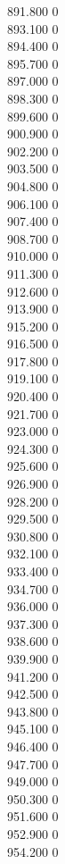 { 891.800	0 \\
 893.100	0 \\
 894.400	0 \\
 895.700	0 \\
 897.000	0 \\
 898.300	0 \\
 899.600	0 \\
 900.900	0 \\
 902.200	0 \\
 903.500	0 \\
 904.800	0 \\
 906.100	0 \\
 907.400	0 \\
 908.700	0 \\
 910.000	0 \\
 911.300	0 \\
 912.600	0 \\
 913.900	0 \\
 915.200	0 \\
 916.500	0 \\
 917.800	0 \\
 919.100	0 \\
 920.400	0 \\
 921.700	0 \\
 923.000	0 \\
 924.300	0 \\
 925.600	0 \\
 926.900	0 \\
 928.200	0 \\
 929.500	0 \\
 930.800	0 \\
 932.100	0 \\
 933.400	0 \\
 934.700	0 \\
 936.000	0 \\
 937.300	0 \\
 938.600	0 \\
 939.900	0 \\
 941.200	0 \\
 942.500	0 \\
 943.800	0 \\
 945.100	0 \\
 946.400	0 \\
 947.700	0 \\
 949.000	0 \\
 950.300	0 \\
 951.600	0 \\
 952.900	0 \\
 954.200	0 \\
}
